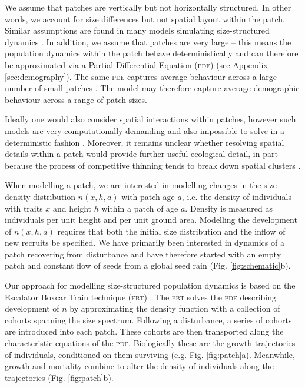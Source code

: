 \documentclass[a4paper,11pt]{article}
\begin{document}
We assume that patches are vertically but not horizontally
structured. In other words, we account for size differences but not spatial 
layout within the patch. Similar assumptions are found in many models
simulating size-structured dynamics
\citep{Shugart-1980,Kohyama-1993, Huston-1987, Moorcroft-2001, Smith-2014}. In addition, 
we assume that patches are very large -- this means the population dynamics 
within the patch behave deterministically \citep{Deroos-1997} and can therefore 
be approximated via a Partial Differential Equation (\textsc{pde}) (see Appendix
\ref{sec:demography}). The same \textsc{pde} captures average behaviour
across a large number of small patches \citep{Moorcroft-2001}. The model may 
therefore capture average demographic behaviour across a range of patch sizes.

Ideally one would also consider spatial interactions within patches,
however such models are very computationally demanding and also
impossible to solve in a deterministic fashion \citep{Huston-1987, 
Pacala-1996}. Moreover, it remains unclear whether resolving spatial details within a
patch would provide further useful ecological detail, in part because the
process of competitive thinning tends to break down spatial clusters
\citep{Strigul-2008}.

When modelling a patch, we are interested in modelling changes in the size-
density-distribution \(n(x,h,a)\) with patch age \(a\), i.e. the density of
individuals with traits \(x\) and height \(h\) within a patch of age \(a\).
Density is measured as individuals per unit height and per unit ground area.
Modelling the development of  \(n(x,h,a)\) requires that both the initial size
distribution and the inflow of new recruits be specified. We have primarily
been interested in dynamics of a patch recovering from disturbance and have
therefore started with an empty patch and constant flow of seeds from a global
seed rain (Fig. \ref{fig:schematic}b).

Our approach for modelling size-structured population dynamics
is based on the Escalator Boxcar Train technique (\textsc{ebt})
\citep{Deroos-1988, Deroos-1992, Deroos-1997}. The \textsc{ebt} solves the \textsc{pde}
describing development of \(n\) by approximating the density function
with a collection of cohorts spanning the size spectrum. Following a
disturbance, a series of cohorts are introduced into each patch. These
cohorts are then transported along the characteristic equations of the
\textsc{pde}. Biologically these are the growth trajectories of individuals,
conditioned on them surviving (e.g. Fig. \ref{fig:patch}a). Meanwhile,
growth and mortality combine to alter the density of individuals along
the trajectories (Fig. \ref{fig:patch}b).
\end{document}
